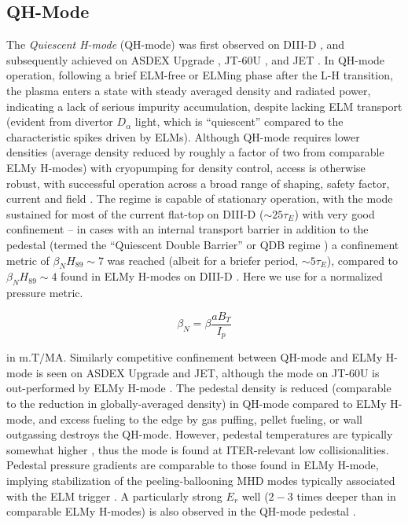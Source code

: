 \subsection{QH-Mode}\label{subsec:hcr_qh}

The \emph{Quiescent H-mode} (QH-mode) was first observed on DIII-D \cite{Burrell2002,Groebner2001}, and subsequently achieved on ASDEX Upgrade \cite{Suttrop2003a}, JT-60U \cite{Sakamoto2004}, and JET \cite{Suttrop2005}.  In QH-mode operation, following a brief ELM-free or ELMing phase after the L-H transition, the plasma enters a state with steady averaged density and radiated power, indicating a lack of serious impurity accumulation, despite lacking ELM transport (evident from divertor $D_\alpha$ light, which is ``quiescent'' compared to the characteristic spikes driven by ELMs).  Although QH-mode requires lower densities (average density reduced by roughly a factor of two from comparable ELMy H-modes) with cryopumping for density control, access is otherwise robust, with successful operation across a broad range of shaping, safety factor, current and field \cite{Burrell2002}.  The regime is capable of stationary operation, with the mode sustained for most of the current flat-top on DIII-D ($\sim 25 \tau_E$)
 with very good confinement -- in cases with an internal transport barrier in addition to the pedestal (termed the ``Quiescent Double Barrier'' or QDB regime \cite{Burrell2001,Doyle2001,Greenfield2002}) a confinement metric of $\beta_N H_{89} \sim 7$ was reached (albeit for a briefer period, $\sim 5 \tau_E$), compared to $\beta_N H_{89} \sim 4$ found in ELMy H-modes on DIII-D \cite{Doyle2001}.  Here we use for a normalized pressure metric.

\begin{equation}\label{eq:betan}
 \beta_N = \beta \frac{aB_T}{I_p}
\end{equation}

\noindent in $\si{\meter.\tesla\per\mega\ampere}$.  Similarly competitive confinement between QH-mode and ELMy H-mode is seen on ASDEX Upgrade and JET, although the mode on JT-60U is out-performed by ELMy H-mode \cite{Oyama2006}.  The pedestal density is reduced (comparable to the reduction in globally-averaged density) in QH-mode compared to ELMy H-mode, and excess fueling to the edge by gas puffing, pellet fueling, or wall outgassing destroys the QH-mode.  However, pedestal temperatures are typically somewhat higher \cite{Doyle2001}, thus the mode is found at ITER-relevant low collisionalities.  Pedestal pressure gradients are comparable to those found in ELMy H-mode, implying stabilization of the peeling-ballooning MHD modes typically associated with the ELM trigger \cite{Burrell2002}.  A particularly strong $E_r$ well ($2-3$ times deeper than in comparable ELMy H-modes) is also observed in the QH-mode pedestal \cite{Greenfield2002}.

